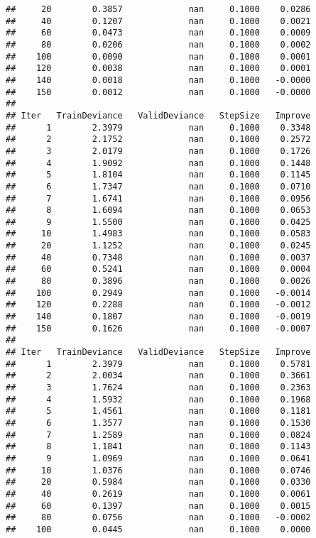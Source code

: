 \documentclass[]{article}
\begin{document}
\begin{verbatim}
##     20        0.3857             nan     0.1000    0.0286
##     40        0.1207             nan     0.1000    0.0021
##     60        0.0473             nan     0.1000    0.0009
##     80        0.0206             nan     0.1000    0.0002
##    100        0.0090             nan     0.1000    0.0001
##    120        0.0038             nan     0.1000    0.0001
##    140        0.0018             nan     0.1000   -0.0000
##    150        0.0012             nan     0.1000   -0.0000
## 
## Iter   TrainDeviance   ValidDeviance   StepSize   Improve
##      1        2.3979             nan     0.1000    0.3348
##      2        2.1752             nan     0.1000    0.2572
##      3        2.0179             nan     0.1000    0.1726
##      4        1.9092             nan     0.1000    0.1448
##      5        1.8104             nan     0.1000    0.1145
##      6        1.7347             nan     0.1000    0.0710
##      7        1.6741             nan     0.1000    0.0956
##      8        1.6094             nan     0.1000    0.0653
##      9        1.5500             nan     0.1000    0.0425
##     10        1.4983             nan     0.1000    0.0583
##     20        1.1252             nan     0.1000    0.0245
##     40        0.7348             nan     0.1000    0.0037
##     60        0.5241             nan     0.1000    0.0004
##     80        0.3896             nan     0.1000    0.0026
##    100        0.2949             nan     0.1000   -0.0014
##    120        0.2288             nan     0.1000   -0.0012
##    140        0.1807             nan     0.1000   -0.0019
##    150        0.1626             nan     0.1000   -0.0007
## 
## Iter   TrainDeviance   ValidDeviance   StepSize   Improve
##      1        2.3979             nan     0.1000    0.5781
##      2        2.0034             nan     0.1000    0.3661
##      3        1.7624             nan     0.1000    0.2363
##      4        1.5932             nan     0.1000    0.1968
##      5        1.4561             nan     0.1000    0.1181
##      6        1.3577             nan     0.1000    0.1530
##      7        1.2589             nan     0.1000    0.0824
##      8        1.1841             nan     0.1000    0.1143
##      9        1.0969             nan     0.1000    0.0641
##     10        1.0376             nan     0.1000    0.0746
##     20        0.5984             nan     0.1000    0.0330
##     40        0.2619             nan     0.1000    0.0061
##     60        0.1397             nan     0.1000    0.0015
##     80        0.0756             nan     0.1000   -0.0002
##    100        0.0445             nan     0.1000    0.0000

\end{verbatim}
\end{document}
